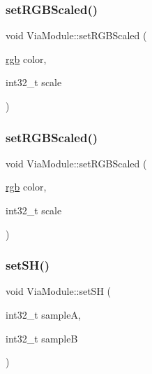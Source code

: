 \mbox{\label{class_via_module_a284349df4c0e5b7153a5b82984fe9aee}} 
\subsubsection{\texorpdfstring{set\+R\+G\+B\+Scaled()}{setRGBScaled()}\hspace{0.1cm}{\footnotesize\ttfamily [1/2]}}
{\footnotesize\ttfamily void Via\+Module\+::set\+R\+G\+B\+Scaled (\begin{DoxyParamCaption}\item[{\mbox{\hyperlink{structrgb}{rgb}}}]{color,  }\item[{int32\+\_\+t}]{scale }\end{DoxyParamCaption})\hspace{0.3cm}{\ttfamily [inline]}}

\mbox{\label{class_via_module_a284349df4c0e5b7153a5b82984fe9aee}} 
\subsubsection{\texorpdfstring{set\+R\+G\+B\+Scaled()}{setRGBScaled()}\hspace{0.1cm}{\footnotesize\ttfamily [2/2]}}
{\footnotesize\ttfamily void Via\+Module\+::set\+R\+G\+B\+Scaled (\begin{DoxyParamCaption}\item[{\mbox{\hyperlink{structrgb}{rgb}}}]{color,  }\item[{int32\+\_\+t}]{scale }\end{DoxyParamCaption})\hspace{0.3cm}{\ttfamily [inline]}}

\mbox{\label{class_via_module_a0f04112b4dde7164b36fa8916e4ae054}} 
\subsubsection{\texorpdfstring{set\+S\+H()}{setSH()}\hspace{0.1cm}{\footnotesize\ttfamily [1/2]}}
{\footnotesize\ttfamily void Via\+Module\+::set\+SH (\begin{DoxyParamCaption}\item[{int32\+\_\+t}]{sampleA,  }\item[{int32\+\_\+t}]{sampleB }\end{DoxyParamCaption})\hspace{0.3cm}{\ttfamily [inline]}}

